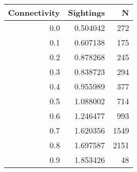 \begin{tabular}{rrr}
\toprule
 Connectivity &  Sightings &    N \\
\midrule
          0.0 &   0.504042 &  272 \\
          0.1 &   0.607138 &  175 \\
          0.2 &   0.878268 &  245 \\
          0.3 &   0.838723 &  294 \\
          0.4 &   0.955989 &  377 \\
          0.5 &   1.088002 &  714 \\
          0.6 &   1.246477 &  993 \\
          0.7 &   1.620356 & 1549 \\
          0.8 &   1.697587 & 2151 \\
          0.9 &   1.853426 &   48 \\
\bottomrule
\end{tabular}

